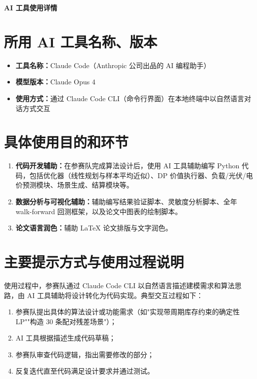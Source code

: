 \documentclass[a4paper,12pt]{ctexart}
\begin{document}
\begin{center}
{\Large\bfseries AI 工具使用详情}
\end{center}

\bigskip

\section{所用 AI 工具名称、版本}

\begin{itemize}
\item \textbf{工具名称：}Claude Code（Anthropic 公司出品的 AI 编程助手）
\item \textbf{模型版本：}Claude Opus 4
\item \textbf{使用方式：}通过 Claude Code CLI（命令行界面）在本地终端中以自然语言对话方式交互
\end{itemize}

\section{具体使用目的和环节}

\begin{enumerate}
\item \textbf{代码开发辅助：}在参赛队完成算法设计后，使用 AI 工具辅助编写 Python 代码，包括优化器（线性规划与样本平均近似）、DP 价值执行器、负载/光伏/电价预测模块、场景生成、结算模块等。
\item \textbf{数据分析与可视化辅助：}辅助编写结果验证脚本、灵敏度分析脚本、全年 walk-forward 回测框架，以及论文中图表的绘制脚本。
\item \textbf{论文语言润色：}辅助 LaTeX 论文排版与文字润色。
\end{enumerate}

\section{主要提示方式与使用过程说明}

使用过程中，参赛队通过 Claude Code CLI 以自然语言描述建模需求和算法思路，由 AI 工具辅助将设计转化为代码实现。典型交互过程如下：

\begin{enumerate}
\item 参赛队提出具体的算法设计或功能需求（如"实现带周期库存约束的确定性 LP""构造 30 条配对残差场景"）；
\item AI 工具根据描述生成代码草稿；
\item 参赛队审查代码逻辑，指出需要修改的部分；
\item 反复迭代直至代码满足设计要求并通过测试。
\end{enumerate}
\end{document}
